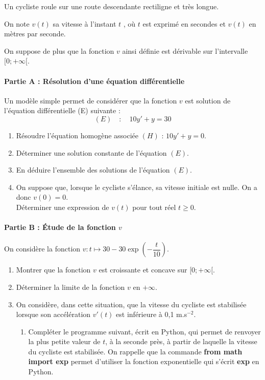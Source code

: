 \documentclass[11pt,fleqn, openany]{book} %
\begin{document}
\begin{exercise}[topic=int02]

    Un cycliste roule sur une route descendante rectiligne et très longue. 
    
    On note $v(t)$ sa vitesse à l'instant $t$ , où $t$ est exprimé en secondes et $v(t)$ en mètres par seconde.

On suppose de plus que la fonction $v$ ainsi définie est dérivable sur l'intervalle $[0;+\infty [$.


\paragraph{Partie A : Résolution d'une équation différentielle}

Un modèle simple permet de considérer que la fonction $v$ est solution de l'équation différentielle (E) suivante :
\[(E) \quad : \quad 10y'+y=30\]

\begin{enumerate}
    \item Résoudre l'équation homogène associée $(H)$ : $10y'+y=0$.
    \item Déterminer une solution constante de l'équation $(E)$.
    \item En déduire l'ensemble des solutions de l'équation $(E)$.
    \item On suppose que, lorsque le cycliste s'élance, sa vitesse initiale est nulle. On a donc $v(0) = 0$. \\ Déterminer une expression de $v(t)$ pour tout réel $t\geqslant 0$.
\end{enumerate}

\paragraph{Partie B : Étude de la fonction $v$}

On considère la fonction $v:t\mapsto 30-30\exp\left(-\dfrac{t}{10}\right)$.
\begin{enumerate}
    \item Montrer que la fonction $v$ est croissante et concave sur $[0;+\infty[$.
    \item Déterminer la limite de la fonction $v$ en $+\infty$.
    \item On considère, dans cette situation, que la vitesse du cycliste est stabilisée lorsque son accélération $v'(t)$ est inférieure à 0,1 m.s$^{-2}$. 
\begin{enumerate}
\item Compléter le programme suivant, écrit en Python, qui permet de renvoyer la plus petite valeur de $t$, à la seconde près, à partir de laquelle la vitesse du cycliste est stabilisée. On rappelle que la commande \textbf{from math import exp }permet d'utiliser la fonction exponentielle qui s'écrit \textbf{exp} en Python.


\end{enumerate}
\end{enumerate}
\end{exercise}
\end{document}

